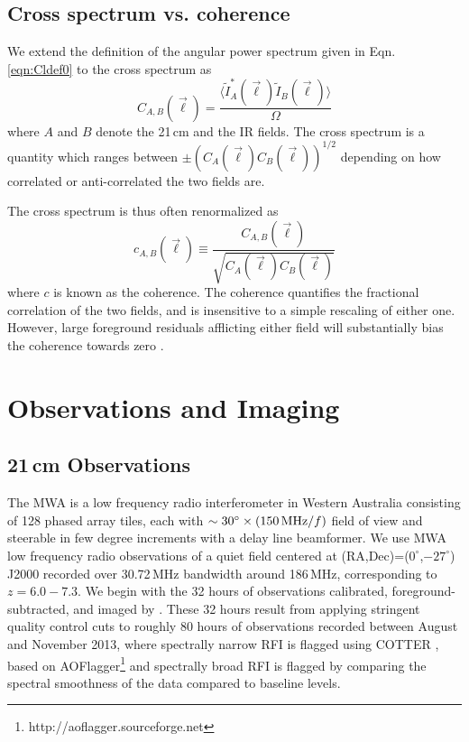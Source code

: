 \documentclass[preprint]{aastex}
\begin{document}
\subsection{Cross spectrum vs. coherence}

We extend the definition of the angular power spectrum given in Eqn. \ref{eqn:Cldef0} to the cross spectrum as
\begin{equation}
\label{eqn:Cldefcross}
	C_{A,B}(\vec{\ell}) = \frac{\langle \tilde{I}_A^*(\vec{\ell})\tilde{I}_B(\vec{\ell})\rangle}{\Omega}
\end{equation}
where $A$ and $B$ denote the 21\,cm and the IR fields. The cross spectrum is a quantity which ranges between $\pm(C_{A}(\vec{\ell})C_{B}(\vec{\ell}))^{1/2}$ depending on how correlated or anti-correlated the two fields are. 

The cross spectrum is thus often renormalized as  
\begin{equation}
\label{eqn:Cldefcross}
	c_{A,B}(\vec{\ell}) \equiv \frac{C_{A,B}(\vec{\ell}) }{\sqrt{C_A(\vec{\ell})  C_B(\vec{\ell}) }}
\end{equation}
where $c$ is known as the coherence. The coherence quantifies the fractional correlation of the two fields, and is insensitive to a simple rescaling of either one. However, large foreground residuals afflicting either field will substantially bias the coherence towards zero \citep{lidz09,furlanettolidz07}. 

\section{Observations and Imaging}
\subsection{21\,cm Observations}

The MWA is a low frequency radio interferometer in Western Australia consisting of 128 phased array tiles, each with $\sim30^\circ\times(150\text{\,MHz}/f)$ field of view and steerable in few degree increments with a delay line beamformer. We use MWA low frequency radio observations of a quiet field centered at (RA,Dec)=($0^\circ$,$-27^\circ$) J2000 recorded over 30.72\,MHz bandwidth around 186\,MHz, corresponding to $z=6.0-7.3$. We begin with the 32 hours of observations calibrated, foreground-subtracted, and imaged by \citet{beardsley16}. These 32 hours result from applying stringent quality control cuts to roughly 80 hours of observations recorded between August and November 2013, where spectrally narrow RFI is flagged using COTTER \citep{AndreMWARFI}, based on AOFlagger\footnote{http://aoflagger.sourceforge.net} \citep{aoflagger} and spectrally broad RFI is flagged by comparing the spectral smoothness of the data compared to baseline levels. 
\end{document}
